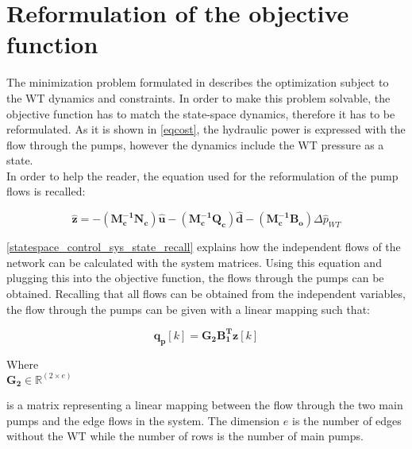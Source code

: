 \section{Reformulation of the objective function}
\label{ObjFunc_reform}

The minimization problem formulated in  describes the optimization subject to the WT dynamics and constraints. In order to make this problem solvable, the objective function has to match the state-space dynamics, therefore it has to be reformulated. As it is shown in \eqref{eqcost}, the hydraulic power is expressed with the flow through the pumps, however the dynamics include the WT pressure as a state. 
\\
\newline
In order to help the reader, the equation used for the reformulation of the pump flows is recalled:

 \begin{equation}
 \pmb{\hat{z}} =  - (\pmb{M_c^{-1}}\pmb{N_c}) \pmb{\hat{u}} - (\pmb{M_c^{-1}}\pmb{Q_c}) \pmb{\hat{d}} - (\pmb{M_c^{-1}}\pmb{B_o}) \Delta \hat{p}_{WT}    
 \label{statespace_control_sys_state_recall}
\end{equation}

\eqref{statespace_control_sys_state_recall} explains how the independent flows of the network can be  calculated with the system matrices. Using this equation and plugging this into the objective function, the flows through the pumps can be obtained. Recalling that all flows can be obtained from the independent variables, the flow through the pumps can be given with a linear mapping such that: 

\begin{equation}
\bm{q_p}[k]  = \bm{G_{2}} \bm{B_{1}^T}  \bm{z}[k]
\label{mapping_mainP}
\end{equation}

\begin{minipage}[t]{0.20\textwidth}
Where\\
\hspace*{8mm} $\bm{G_{2}} \in \bm{\mathbb{R}}^{(2 \times e)} $ 
\end{minipage}
\begin{minipage}[t]{0.68\textwidth}
\vspace*{2mm}
is a matrix representing a linear mapping between the flow through the two main pumps and the edge flows in the system. The dimension $e$ is the number of edges without the WT while the number of rows is the number of main pumps. 
\end{minipage} 

